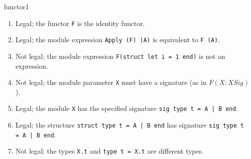 \begin{exercise}{functor1}
\begin{enumerate}
\end{enumerate}

\begin{answer}\ifanswers
\begin{enumerate}
\item

Legal; the functor \hbox{\lstinline$F$} is the identity functor.
\item

Legal; the module expression \hbox{\lstinline$Apply (F) (A)$} is
equivalent to \hbox{\lstinline$F (A)$}.
\item

Not legal; the module expression
\hbox{\lstinline$F(struct let i = 1 end)$}
is not an expression.
\item

Not legal; the module parameter \hbox{\lstinline$X$} must have a
signature (as in $F (X : XSig)$).
\item

Legal; the module \hbox{\lstinline$X$} has the specified
signature \hbox{\lstinline$sig type t = A | B end$}.
\item

Legal; the structure \hbox{\lstinline$struct type t = A | B end$} has
signature \hbox{\lstinline$sig type t = A | B end$}.
\item

Not legal; the types \hbox{\lstinline$X.t$} and
\hbox{\lstinline$type t = X.t$}
are different types.
\end{enumerate}
\fi\end{answer}
\end{exercise}


